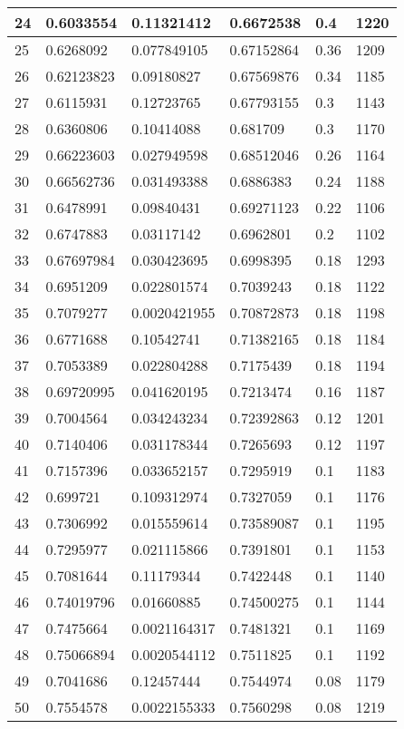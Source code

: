 \begin{longtable}{|l|l|l|l|l|l|}
24 & 0.6033554 & 0.11321412 & 0.6672538 & 0.4 & 1220 \\ \hline 
25 & 0.6268092 & 0.077849105 & 0.67152864 & 0.36 & 1209 \\ \hline 
26 & 0.62123823 & 0.09180827 & 0.67569876 & 0.34 & 1185 \\ \hline 
27 & 0.6115931 & 0.12723765 & 0.67793155 & 0.3 & 1143 \\ \hline 
28 & 0.6360806 & 0.10414088 & 0.681709 & 0.3 & 1170 \\ \hline 
29 & 0.66223603 & 0.027949598 & 0.68512046 & 0.26 & 1164 \\ \hline 
30 & 0.66562736 & 0.031493388 & 0.6886383 & 0.24 & 1188 \\ \hline 
31 & 0.6478991 & 0.09840431 & 0.69271123 & 0.22 & 1106 \\ \hline 
32 & 0.6747883 & 0.03117142 & 0.6962801 & 0.2 & 1102 \\ \hline 
33 & 0.67697984 & 0.030423695 & 0.6998395 & 0.18 & 1293 \\ \hline 
34 & 0.6951209 & 0.022801574 & 0.7039243 & 0.18 & 1122 \\ \hline 
35 & 0.7079277 & 0.0020421955 & 0.70872873 & 0.18 & 1198 \\ \hline 
36 & 0.6771688 & 0.10542741 & 0.71382165 & 0.18 & 1184 \\ \hline 
37 & 0.7053389 & 0.022804288 & 0.7175439 & 0.18 & 1194 \\ \hline 
38 & 0.69720995 & 0.041620195 & 0.7213474 & 0.16 & 1187 \\ \hline 
39 & 0.7004564 & 0.034243234 & 0.72392863 & 0.12 & 1201 \\ \hline 
40 & 0.7140406 & 0.031178344 & 0.7265693 & 0.12 & 1197 \\ \hline 
41 & 0.7157396 & 0.033652157 & 0.7295919 & 0.1 & 1183 \\ \hline 
42 & 0.699721 & 0.109312974 & 0.7327059 & 0.1 & 1176 \\ \hline 
43 & 0.7306992 & 0.015559614 & 0.73589087 & 0.1 & 1195 \\ \hline 
44 & 0.7295977 & 0.021115866 & 0.7391801 & 0.1 & 1153 \\ \hline 
45 & 0.7081644 & 0.11179344 & 0.7422448 & 0.1 & 1140 \\ \hline 
46 & 0.74019796 & 0.01660885 & 0.74500275 & 0.1 & 1144 \\ \hline 
47 & 0.7475664 & 0.0021164317 & 0.7481321 & 0.1 & 1169 \\ \hline 
48 & 0.75066894 & 0.0020544112 & 0.7511825 & 0.1 & 1192 \\ \hline 
49 & 0.7041686 & 0.12457444 & 0.7544974 & 0.08 & 1179 \\ \hline 
50 & 0.7554578 & 0.0022155333 & 0.7560298 & 0.08 & 1219 \\ \hline 
\end{longtable}